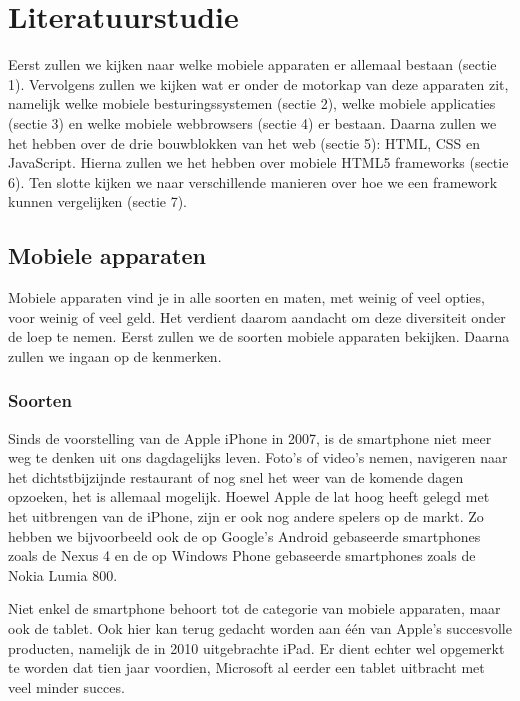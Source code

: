 \chapter{Literatuurstudie}
\label{hoofdstuk:2}
Eerst zullen we kijken naar welke mobiele apparaten er allemaal bestaan (sectie 1). Vervolgens zullen we kijken wat er onder de motorkap van deze apparaten zit, namelijk welke mobiele besturingssystemen (sectie 2), welke mobiele applicaties (sectie 3) en welke mobiele webbrowsers (sectie 4) er bestaan. Daarna zullen we het hebben over de drie bouwblokken van het web (sectie 5):  HTML,  CSS en JavaScript. Hierna zullen we het hebben over mobiele HTML5 frameworks (sectie 6).  Ten slotte kijken we naar verschillende manieren over hoe we een framework kunnen vergelijken (sectie 7).


\section{Mobiele apparaten}
Mobiele apparaten vind je in alle soorten en maten, met weinig of veel opties, voor weinig of veel geld. Het verdient daarom aandacht om deze diversiteit onder de loep te nemen. Eerst zullen we de soorten mobiele apparaten bekijken. Daarna zullen we ingaan op de kenmerken.

\subsection{Soorten}
Sinds de voorstelling van de Apple iPhone in 2007, is de smartphone niet meer weg te denken uit ons dagdagelijks leven. Foto's of video's nemen, navigeren naar het dichtstbijzijnde restaurant of nog snel het weer van de komende dagen opzoeken, het is allemaal mogelijk. Hoewel Apple de lat hoog heeft gelegd met het uitbrengen van de iPhone, zijn er ook nog andere spelers op de markt. Zo hebben we bijvoorbeeld ook de op Google's Android gebaseerde smartphones zoals de Nexus 4 en de op Windows Phone gebaseerde smartphones zoals de Nokia Lumia 800.

Niet enkel de smartphone behoort tot de categorie van mobiele apparaten, maar ook de tablet. Ook hier kan terug gedacht worden aan één van Apple's succesvolle producten, namelijk de in 2010 uitgebrachte iPad. Er dient echter wel opgemerkt te worden dat tien jaar voordien, Microsoft al eerder een tablet uitbracht met veel minder succes.

